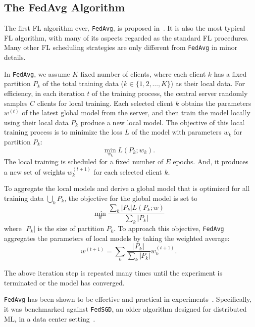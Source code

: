 \documentclass[conference]{IEEEtran}
\begin{document}
\subsection{The FedAvg Algorithm}

The first FL algorithm ever, \verb|FedAvg|,
is proposed in~\cite{mcmahan2017communication}.
It is also the most typical FL algorithm,
with many of its aspects regarded as the standard FL procedures.
Many other FL scheduling strategies are only different from \verb|FedAvg| in
minor details.

In \verb|FedAvg|,
we assume $K$ fixed number of clients,
where each client $k$ has a fixed partition $P_k$ of
the total training data ($k \in \{1, 2, \dots, K\}$) as their local data.
For efficiency,
in each iteration $t$ of the training process,
the central server randomly samples $C$ clients for local training.
Each selected client $k$ obtains the parameters $w^{(t)}$ of
the latest global model from the server,
and then train the model locally using their local data $P_k$
produce a new local model.
The objective of this local training process is to minimize the loss $L$ of
the model with parameters $w_k$ for partition $P_k$:
\begin{equation}
    \min_{w_k} L(P_k;w_k).
\end{equation}
The local training is scheduled for a fixed number of $E$ epochs.
And, it produces a new set of weights $w_k^{(t+1)}$ for
each selected client $k$.

To aggregate the local models and derive a global model that
is optimized for all training data $\bigcup_k P_k$,
the objective for the global model is set to
\begin{equation}
    \min_{w} \frac{\sum_k |P_k|L(P_k;w)}{\sum_k |P_k|}
\end{equation}
where $|P_k|$ is the size of partition $P_k$.
To approach this objective,
\verb|FedAvg| aggregates the parameters of local models by
taking the weighted average:
\begin{equation}
    w^{(t+1)}=\sum_k \frac{|P_k|}{\sum_k |P_k|}w_k^{(t+1)}.
\end{equation}

The above iteration step is repeated many times until
the experiment is terminated or
the model has converged.

\verb|FedAvg| has been shown to be effective and practical
in experiments~\cite{mcmahan2017communication}.
Specifically, it was benchmarked against \verb|FedSGD|\cite{chen2016revisiting},
an older algorithm designed for distributed ML,
in a data center setting~\cite{bonawitz2019towards}.
\end{document}
